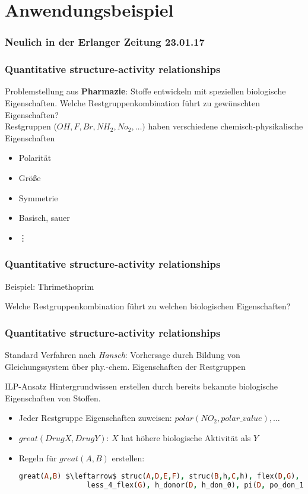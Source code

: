 \section{Anwendungsbeispiel}
\begin{frame}
	\frametitle{Neulich in der Erlanger Zeitung 23.01.17}
\end{frame}

\begin{frame}
	\frametitle{Quantitative structure-activity relationships}
	Problemstellung aus \textbf{Pharmazie}: Stoffe entwickeln mit speziellen biologische Eigenschaften.
	Welche Restgruppenkombination führt zu gewünschten Eigenschaften?\\

	Restgruppen ($OH, F, Br, NH_2, No_2, \ldots)$ haben verschiedene
	chemisch-physikalische Eigenschaften
	\begin{itemize}
		\item Polarität
		\item Größe
		\item Symmetrie
		\item Basisch, sauer
		\item {\hspace{5pt}\vdots}
	\end{itemize}
\end{frame}
\begin{frame}
	\frametitle{Quantitative structure-activity relationships}
	\begin{block}{Beispiel: Thrimethoprim}
	\end{block}
	Welche Restgruppenkombination führt zu welchen biologischen Eigenschaften?
\end{frame}
\begin{frame}[fragile]
	\frametitle{Quantitative structure-activity relationships}
	Standard Verfahren nach \textit{Hansch}: Vorhersage durch Bildung von
	Gleichungssystem über phy.-chem. Eigenschaften der Restgruppen

	\begin{block}{ILP-Ansatz}
	Hintergrundwissen erstellen durch bereits bekannte biologische Eigenschaften
	von Stoffen.
	\begin{itemize}
		\item Jeder Restgruppe Eigenschaften zuweisen: $polar(NO_2, polar\_value), \ldots$
		\item $great(DrugX, DrugY)$: $X$ hat höhere biologische Aktivität als $Y$
		\item Regeln für $great(A,B)$ erstellen: 
			\begin{lstlisting}[language=prolog]
				great(A,B) $\leftarrow$ struc(A,D,E,F), struc(B,h,C,h), flex(D,G),
				less_4_flex(G), h_donor(D, h_don_0), pi(D, po_don_1).
			\end{lstlisting}
	\end{itemize}
	\end{block}
\end{frame}

